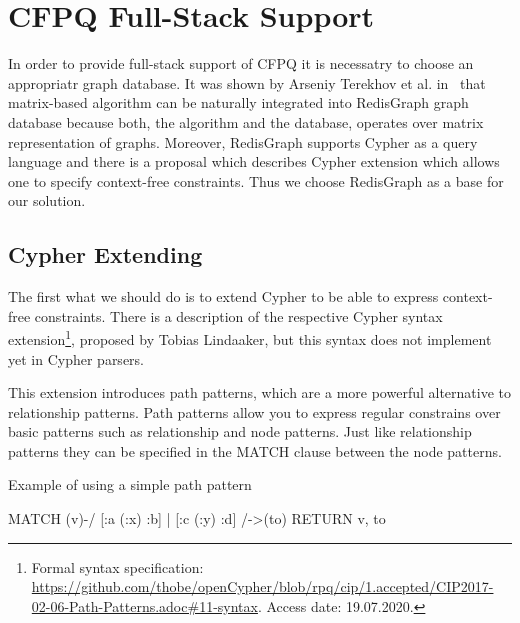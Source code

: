 \section{CFPQ Full-Stack Support}

In order to provide full-stack support of CFPQ it is necessatry to choose an appropriatr graph database.
It was shown by Arseniy Terekhov et al. in~\cite{10.1145/3398682.3399163} that matrix-based algorithm can be naturally integrated into RedisGraph graph database because both, the algorithm and the database, operates over matrix representation of graphs.
Moreover, RedisGraph supports Cypher as a query language and there is a proposal which describes Cypher extension which allows one to specify context-free constraints.
Thus we choose RedisGraph as a base for our solution.  


\subsection{Cypher Extending}
\label{subsec:cypher-extension}

The first what we should do is to extend Cypher to be able to express context-free constraints.
There is a description of the respective Cypher syntax extension\footnote{\label{cypher-proposal}Formal syntax specification: \url{https://github.com/thobe/openCypher/blob/rpq/cip/1.accepted/CIP2017-02-06-Path-Patterns.adoc\#11-syntax}. Access date: 19.07.2020.}, proposed by Tobias Lindaaker, but this syntax does not implement yet in Cypher parsers.

This extension introduces path patterns, which are a more powerful alternative to relationship patterns. Path patterns allow you to express regular constrains over basic patterns such as relationship and node patterns. Just like relationship patterns they can be specified in the MATCH clause between the node patterns.

\begin{algorithm}
\begin{algorithmic}[1]
\caption{Example of using a simple path pattern}
\label{lst:cypher-example-1}
\State MATCH (v)-/ [:a (:x) :b] | [:c (:y) :d] /->(to)
\State RETURN v, to
\end{algorithmic}
\end{algorithm}

